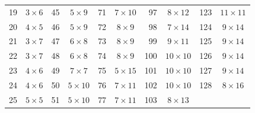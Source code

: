 \begin{longtable}{
r|c @{\qquad}
r|c @{\qquad}
r|c @{\qquad}
r|c @{\qquad}
r|c
}
19 & $3 \times 6$  &
45 & $5 \times 9$  &
71 & $7 \times 10$ &
97 & $8 \times 12$ &
123 & $11 \times 11$ \\

20 & $4 \times 5$  &
46 & $5 \times 9$  &
72 & $8 \times 9$  &
98 & $7 \times 14$ &
124 & $9 \times 14$ \\

21 & $3 \times 7$  &
47 & $6 \times 8$  &
73 & $8 \times 9$  &
99 & $9 \times 11$ &
125 & $9 \times 14$ \\

22 & $3 \times 7$  &
48 & $6 \times 8$  &
74 & $8 \times 9$  &
100 & $10 \times 10$ &
126 & $9 \times 14$ \\

23 & $4 \times 6$  &
49 & $7 \times 7$  &
75 & $5 \times 15$ &
101 & $10 \times 10$ &
127 & $9 \times 14$ \\

24 & $4 \times 6$  &
50 & $5 \times 10$ &
76 & $7 \times 11$ &
102 & $10 \times 10$ &
128 & $8 \times 16$ \\

25 & $5 \times 5$  &
51 & $5 \times 10$ &
77 & $7 \times 11$ &
103 & $8 \times 13$ &
&               \\

\end{longtable}
\endgroup
